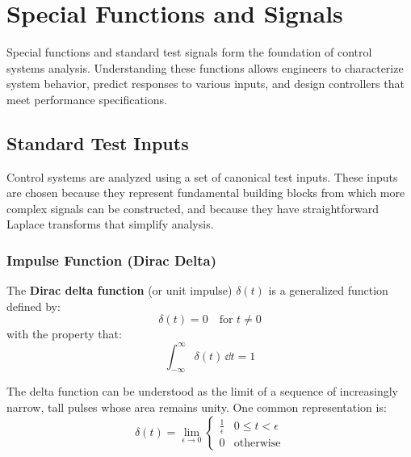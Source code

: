 \chapter{Special Functions and Signals}
\label{ch:special_functions}

Special functions and standard test signals form the foundation of control systems analysis. Understanding these functions allows engineers to characterize system behavior, predict responses to various inputs, and design controllers that meet performance specifications.

\section{Standard Test Inputs}

Control systems are analyzed using a set of canonical test inputs. These inputs are chosen because they represent fundamental building blocks from which more complex signals can be constructed, and because they have straightforward Laplace transforms that simplify analysis.



\subsection{Impulse Function (Dirac Delta)}

\begin{definitionbox}[title=Definition 10.1: Dirac Delta Function]
The \textbf{Dirac delta function} (or unit impulse) $\delta(t)$ is a generalized function defined by:
\begin{equation}
\delta(t) = 0 \quad \text{for } t \neq 0
\end{equation}
with the property that:
\begin{equation}
\int_{-\infty}^{\infty} \delta(t) \, \dd t = 1
\end{equation}
\end{definitionbox}

The delta function can be understood as the limit of a sequence of increasingly narrow, tall pulses whose area remains unity. One common representation is:
\begin{equation}
\delta(t) = \lim_{\epsilon \to 0} \begin{cases} \frac{1}{\epsilon} & 0 \leq t < \epsilon \\ 0 & \text{otherwise} \end{cases}
\end{equation}

